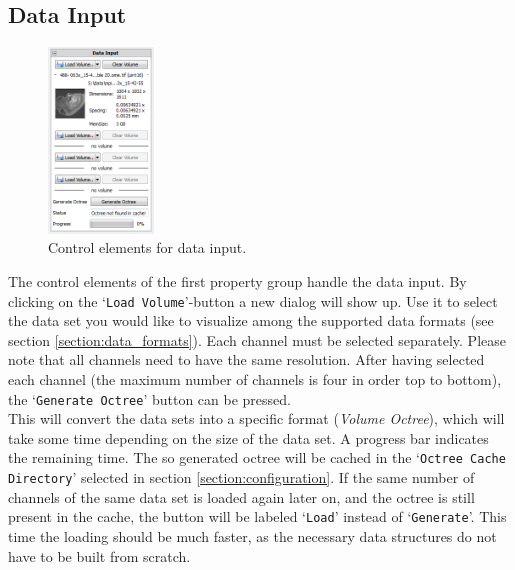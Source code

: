 \subsection{Data Input}\label{ultramicroscopy.section.datainput}
\begin{figure}
\vspace*{-1cm}
\centering
\includegraphics[width=0.25\textwidth]{images/data_input.png}
\caption{Control elements for data input.}
\label{ultramicroscopy.figure.datainput}
\end{figure}
The control elements of the first property group handle the data input. By clicking on the `\verb|Load Volume|'-button a new dialog will show up. 
Use it to select the data set you would like to visualize among the supported data formats (see section \ref{section:data_formats}). 
Each channel must be selected separately. Please note that all channels need to have the same resolution. 
After having selected each channel (the maximum number of channels is four in order top to bottom), the `\verb|Generate Octree|' button can be pressed.\\
This will convert the data sets into a specific \Voreen format (\emph{Volume Octree}), which will take some time depending on the size of the data set. 
A progress bar indicates the remaining time. The so generated octree will be cached in the `\verb|Octree Cache Directory|' selected in section \ref{section:configuration}. 
If the same number of channels of the same data set is loaded again later on, and the octree is still present in the cache, the button will be labeled `\verb|Load|' instead of `\verb|Generate|'. 
This time the loading should be much faster, as the necessary data structures do not have to be built from scratch.

